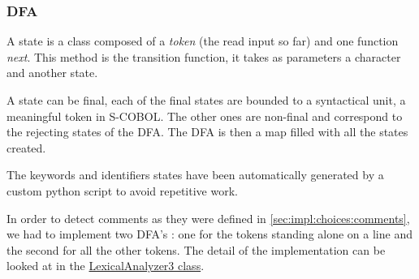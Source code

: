 \subsubsection{DFA}

A state is a class composed of a \textit{token} (the read input so far) and one function \textit{next}. This method is the transition function, it takes as parameters a character and another state.

A state can be final, each of the final states are bounded to a syntactical unit, a meaningful token in S-COBOL. The other ones are non-final and correspond to the rejecting states of the DFA.
The DFA is then a map filled with all the states created.

The keywords and identifiers states have been automatically generated by a custom python script to avoid repetitive work.

In order to detect comments as they were defined in \ref{sec:impl:choices:comments}, we had to implement two DFA's : one for the tokens standing alone on a line and the second for all the other tokens. The detail of the implementation can be looked at in the \href{../more/src/cs/lang/LexicalAnalyzer3.java}{LexicalAnalyzer3 class}.